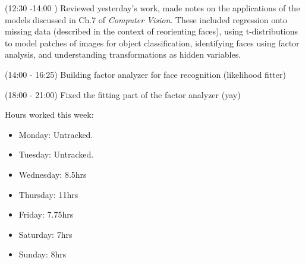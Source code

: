 \documentclass[idxtotoc,hyperref,openany]{labbook} %
\begin{document}
(12:30 -14:00 ) Reviewed yesterday's work, made notes on the applications of the models discussed in Ch.7 of \emph{Computer Vision}. These included regression onto missing data (described in the context of reorienting faces), using t-distributions to model patches of images for object classification, identifying faces using factor analysis, and understanding transformations as hidden variables.

(14:00 - 16:25) Building factor analyzer for face recognition (likelihood fitter)

(18:00 - 21:00) Fixed the fitting part of the factor analyzer (yay)

Hours worked this week:
\begin{itemize}
	\item Monday: Untracked.
	\item Tuesday: Untracked.
	\item Wednesday: 8.5hrs
	\item Thursday: 11hrs
	\item Friday: 7.75hrs
	\item Saturday: 7hrs
	\item Sunday: 8hrs
\end{itemize}
\end{document}
